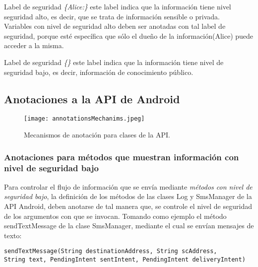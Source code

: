 Label de seguridad \emph{\{Alice:\}}\newline
este label indica que la información tiene nivel seguridad alto, es decir, que
se trata de información sensible o privada.\\
Variables con nivel de seguridad alto deben ser anotadas con tal label de
seguridad, porque esté específica que sólo el dueño de la información(Alice)
puede acceder a la misma. 

Label de seguridad \emph{\{\}}\newline
este label indica que la información tiene nivel de seguridad bajo, es decir,
información de conocimiento público.

\subsection{Anotaciones a la API de Android}
\label{subsec:api}

\begin{figure}[h!]
	\begin{center}
	\texttt{[image: annotationsMechanims.jpeg]}
	\end{center}
	\caption{Mecanismos de anotación para clases de la API.}
	\label{fig:annotationsMechanims}  
\end{figure}

\subsubsection{Anotaciones para  métodos que muestran información con nivel de
seguridad bajo} 
Para controlar el flujo de información que se envía mediante \textit{métodos con
nivel de seguridad bajo}, la definición de los métodos de las clases Log y
SmsManager de la API Android, deben anotarse de tal manera que, se controle el
nivel de seguridad de los argumentos con que se invocan.\newline 
Tomando como ejemplo el método sendTextMessage de la clase SmsManager, mediante
el cual se envían mensajes de texto:
\begin{lstlisting}
sendTextMessage(String destinationAddress, String scAddress, 
String text, PendingIntent sentIntent, PendingIntent deliveryIntent)
\end{lstlisting}

